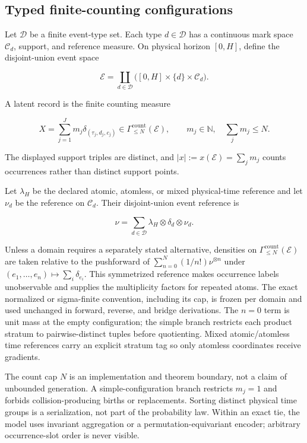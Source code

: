 \documentclass[11pt]{article}
\begin{document}
\subsection{Typed finite-counting configurations}
\label{sec:typed-finite-counting-configurations}

Let \(\mathcal D\) be a finite event-type set. Each type \(d\in\mathcal D\) has a continuous mark space \(\mathcal C_d\), support, and reference measure. On physical horizon \([0,H]\), define the disjoint-union event space

\[
\mathcal E
=\coprod_{d\in\mathcal D}
  \bigl([0,H]\times\{d\}\times\mathcal C_d\bigr).
\]

A latent record is the finite counting measure

\[
X=\sum_{j=1}^{J}m_j\delta_{(\tau_j,d_j,c_j)}
\in\Gamma_{\le N}^{\mathrm{count}}(\mathcal E),
\qquad
m_j\in\mathbb N,
\quad \sum_j m_j\le N.
\]

The displayed support triples are distinct, and \(|x|:=x(\mathcal E)=\sum_j m_j\) counts occurrences rather than distinct support points.

Let \(\lambda_H\) be the declared atomic, atomless, or mixed physical-time reference and let \(\nu_d\) be the reference on \(\mathcal C_d\). Their disjoint-union event reference is

\[
\nu
=\sum_{d\in\mathcal D}
  \lambda_H\otimes\delta_d\otimes\nu_d.
\]

Unless a domain requires a separately stated alternative, densities on \(\Gamma_{\le N}^{\mathrm{count}}(\mathcal E)\) are taken relative to the pushforward of \(\sum_{n=0}^{N}(1/n!)\nu^{\otimes n}\) under \((e_1,\ldots,e_n)\mapsto\sum_i\delta_{e_i}\). This symmetrized reference makes occurrence labels unobservable and supplies the multiplicity factors for repeated atoms. The exact normalized or sigma-finite convention, including its cap, is frozen per domain and used unchanged in forward, reverse, and bridge derivations. The \(n=0\) term is unit mass at the empty configuration; the simple branch restricts each product stratum to pairwise-distinct tuples before quotienting. Mixed atomic/\allowbreak{}atomless time references carry an explicit stratum tag so only atomless coordinates receive gradients.

The count cap \(N\) is an implementation and theorem boundary, not a claim of unbounded generation. A simple-configuration branch restricts \(m_j=1\) and forbids collision-producing births or replacements. Sorting distinct physical time groups is a serialization, not part of the probability law. Within an exact tie, the model uses invariant aggregation or a permutation-equivariant encoder; arbitrary occurrence-slot order is never visible.
\end{document}
